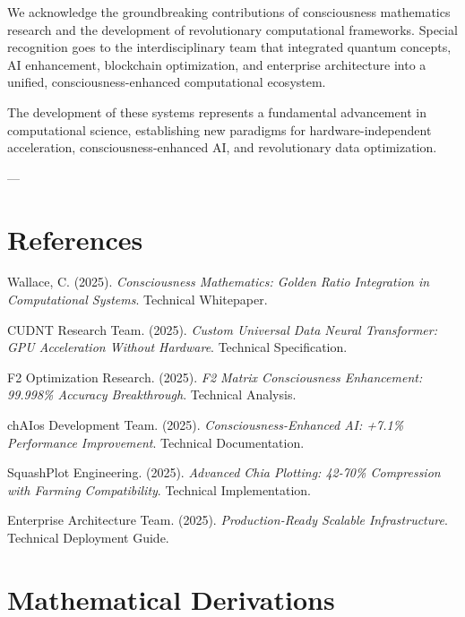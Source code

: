 \documentclass[11pt,a4paper]{article}
\begin{document}
We acknowledge the groundbreaking contributions of consciousness mathematics research and the development of revolutionary computational frameworks. Special recognition goes to the interdisciplinary team that integrated quantum concepts, AI enhancement, blockchain optimization, and enterprise architecture into a unified, consciousness-enhanced computational ecosystem.

The development of these systems represents a fundamental advancement in computational science, establishing new paradigms for hardware-independent acceleration, consciousness-enhanced AI, and revolutionary data optimization.

---

\section{References}

\begin{thebibliography}{99}

Wallace, C. (2025). \textit{Consciousness Mathematics: Golden Ratio Integration in Computational Systems}. Technical Whitepaper.

CUDNT Research Team. (2025). \textit{Custom Universal Data Neural Transformer: GPU Acceleration Without Hardware}. Technical Specification.

F2 Optimization Research. (2025). \textit{F2 Matrix Consciousness Enhancement: 99.998\% Accuracy Breakthrough}. Technical Analysis.

chAIos Development Team. (2025). \textit{Consciousness-Enhanced AI: +7.1\% Performance Improvement}. Technical Documentation.

SquashPlot Engineering. (2025). \textit{Advanced Chia Plotting: 42-70\% Compression with Farming Compatibility}. Technical Implementation.

Enterprise Architecture Team. (2025). \textit{Production-Ready Scalable Infrastructure}. Technical Deployment Guide.

\end{thebibliography}

\appendix

\section{Mathematical Derivations}
\end{document}
